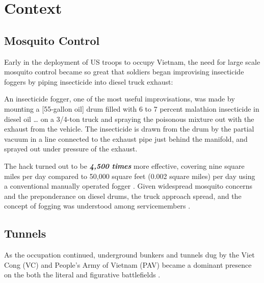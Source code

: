 \documentclass[
  11pt,
]{krantz}
\renewenvironment{quote}{\begin{VF}}{\end{VF}}
\begin{document}
\hypertarget{context}{%
\section*{Context}\label{context}}


\hypertarget{mosquito-control}{%
\subsection*{Mosquito Control}\label{mosquito-control}}


Early in the deployment of US troops to occupy Vietnam, the need for large scale mosquito control became so great that soldiers began improvising insecticide foggers by piping insecticide into diesel truck exhaust:

\begin{quote}
An insecticide fogger, one of the most useful improvisations, was made by mounting a {[}55-gallon oil{]} drum filled with 6 to 7 percent malathion insecticide in diesel oil \ldots{} on a 3/4-ton truck and spraying the poisonous mixture out with the exhaust from the vehicle. The insecticide is drawn from the drum by the partial vacuum in a line connected to the exhaust pipe just behind the manifold, and sprayed out under pressure of the exhaust.

\end{quote}

The hack turned out to be \textbf{\emph{4,500 times}} more effective, covering nine square miles per day compared to 50,000 square feet (0.002 square miles) per day using a conventional manually operated fogger \citep{Spicknall1969}.
Given widespread mosquito concerns and the preponderance on diesel drums, the truck approach spread, and the concept of fogging was understood among servicemembers \citep{USMACV1965, Spicknall1969}.

\hypertarget{tunnels}{%
\subsection*{Tunnels}\label{tunnels}}


As the occupation continued, underground bunkers and tunnels dug by the Viet Cong (VC) and People's Army of Vietnam (PAV) became a dominant presence on the both the literal and figurative battlefields \citep{Rottman2006, Rottman2012}.
\end{document}
